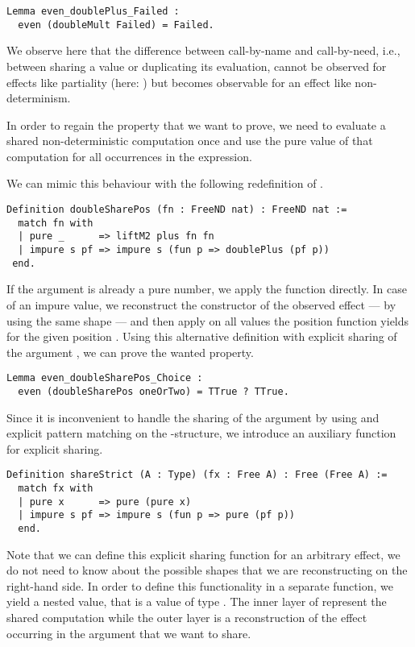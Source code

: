 \begin{verbatim}
Lemma even_doublePlus_Failed :
  even (doubleMult Failed) = Failed.
\end{verbatim}

We observe here that the difference between call-by-name and
call-by-need, i.e., between sharing a value or duplicating its
evaluation, cannot be observed for effects like partiality (here:
) but becomes observable for an effect like
non-determinism.

In order to regain the property that we want to prove, we need to
evaluate a shared non-deterministic computation once and use the pure
value of that computation for all occurrences in the expression.

We can mimic this behaviour with the following redefinition of
.

\begin{verbatim}
Definition doubleSharePos (fn : FreeND nat) : FreeND nat :=
  match fn with
  | pure _      => liftM2 plus fn fn
  | impure s pf => impure s (fun p => doublePlus (pf p))
 end.
\end{verbatim}

If the argument  is already a pure number, we apply the
function  directly.
In case of an impure value, we reconstruct the constructor of the
observed effect --- by using the same shape  --- and then
apply  on all values the position function 
yields for the given position .
Using this alternative definition with explicit sharing of the
argument , we can prove the wanted property.

\begin{verbatim}
Lemma even_doubleSharePos_Choice :
  even (doubleSharePos oneOrTwo) = TTrue ? TTrue.
\end{verbatim}

Since it is inconvenient to handle the sharing of the argument
 by using and explicit pattern matching on the
-structure, we introduce an auxiliary function for explicit
sharing.

\begin{verbatim}
Definition shareStrict (A : Type) (fx : Free A) : Free (Free A) :=
  match fx with
  | pure x      => pure (pure x)
  | impure s pf => impure s (fun p => pure (pf p))
  end.
\end{verbatim}

Note that we can define this explicit sharing function for an
arbitrary effect, we do not need to know about the possible shapes
that we are reconstructing on the right-hand side.
In order to define this functionality in a separate function, we yield
a nested value, that is a value of type .
The inner layer of  represent the shared computation while
the outer layer is a reconstruction of the effect occurring in the
argument  that we want to share.

